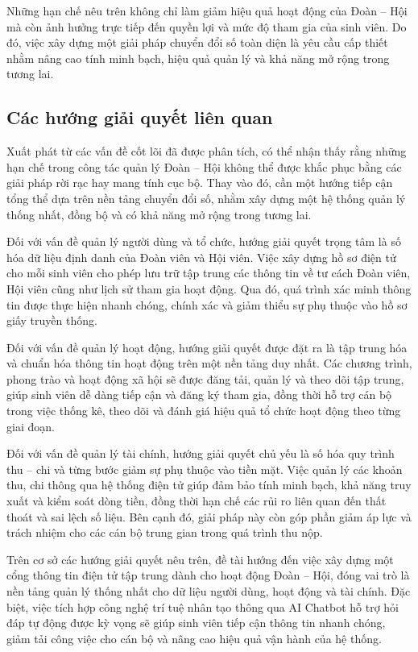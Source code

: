 Những hạn chế nêu trên không chỉ làm giảm hiệu quả hoạt động của Đoàn -- Hội mà còn ảnh hưởng trực tiếp đến quyền lợi và mức độ tham gia của sinh viên. Do đó, việc xây dựng một giải pháp chuyển đổi số toàn diện là yêu cầu cấp thiết nhằm nâng cao tính minh bạch, hiệu quả quản lý và khả năng mở rộng trong tương lai.
\subsection{Các hướng giải quyết liên quan}

Xuất phát từ các vấn đề cốt lõi đã được phân tích, có thể nhận thấy rằng những hạn chế trong công tác quản lý Đoàn -- Hội không thể được khắc phục bằng các giải pháp rời rạc hay mang tính cục bộ. Thay vào đó, cần một hướng tiếp cận tổng thể dựa trên nền tảng chuyển đổi số, nhằm xây dựng một hệ thống quản lý thống nhất, đồng bộ và có khả năng mở rộng trong tương lai.

Đối với vấn đề quản lý người dùng và tổ chức, hướng giải quyết trọng tâm là số hóa dữ liệu định danh của Đoàn viên và Hội viên. Việc xây dựng hồ sơ điện tử cho mỗi sinh viên cho phép lưu trữ tập trung các thông tin về tư cách Đoàn viên, Hội viên cũng như lịch sử tham gia hoạt động. Qua đó, quá trình xác minh thông tin được thực hiện nhanh chóng, chính xác và giảm thiểu sự phụ thuộc vào hồ sơ giấy truyền thống.

Đối với vấn đề quản lý hoạt động, hướng giải quyết được đặt ra là tập trung hóa và chuẩn hóa thông tin hoạt động trên một nền tảng duy nhất. Các chương trình, phong trào và hoạt động xã hội sẽ được đăng tải, quản lý và theo dõi tập trung, giúp sinh viên dễ dàng tiếp cận và đăng ký tham gia, đồng thời hỗ trợ cán bộ trong việc thống kê, theo dõi và đánh giá hiệu quả tổ chức hoạt động theo từng giai đoạn.

Đối với vấn đề quản lý tài chính, hướng giải quyết chủ yếu là số hóa quy trình thu -- chi và từng bước giảm sự phụ thuộc vào tiền mặt. Việc quản lý các khoản thu, chi thông qua hệ thống điện tử giúp đảm bảo tính minh bạch, khả năng truy xuất và kiểm soát dòng tiền, đồng thời hạn chế các rủi ro liên quan đến thất thoát và sai lệch số liệu. Bên cạnh đó, giải pháp này còn góp phần giảm áp lực và trách nhiệm cho các cán bộ trung gian trong quá trình thu nộp.

Trên cơ sở các hướng giải quyết nêu trên, đề tài hướng đến việc xây dựng một cổng thông tin điện tử tập trung dành cho hoạt động Đoàn -- Hội, đóng vai trò là nền tảng quản lý thống nhất cho dữ liệu người dùng, hoạt động và tài chính. Đặc biệt, việc tích hợp công nghệ trí tuệ nhân tạo thông qua AI Chatbot hỗ trợ hỏi đáp tự động được kỳ vọng sẽ giúp sinh viên tiếp cận thông tin nhanh chóng, giảm tải công việc cho cán bộ và nâng cao hiệu quả vận hành của hệ thống.

